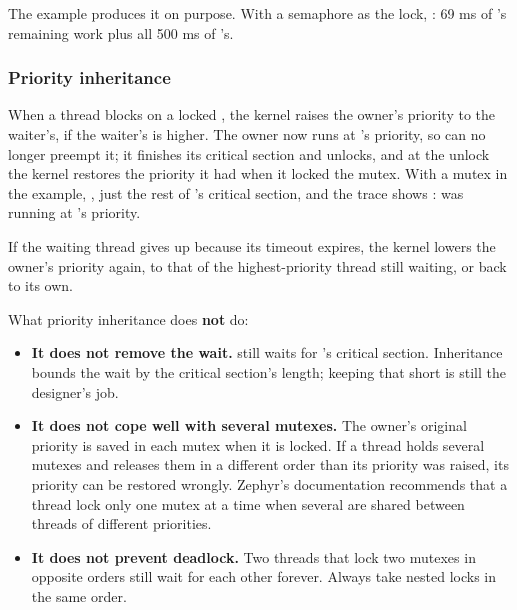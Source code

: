 The  example produces it on purpose. With a semaphore
as the lock, : 69 ms of ’s remaining work plus all 500 ms of
’s.

\subsubsection{Priority inheritance}
When a thread blocks on a locked , the kernel raises the owner’s priority to the
waiter’s, if the waiter’s is higher. The owner now runs at ’s priority, so 
can no longer preempt it; it finishes its critical section and unlocks, and at the unlock the kernel
restores the priority it had when it locked the mutex. With a mutex in the example, , just the rest of ’s critical section, and the trace shows :  was running at ’s priority.


If the waiting thread gives up because its timeout expires, the kernel lowers the owner’s priority
again, to that of the highest-priority thread still waiting, or back to its own.

What priority inheritance does \textbf{not} do:

\begin{itemize}
  \item \textbf{It does not remove the wait.}  still waits for ’s critical section.
    Inheritance bounds the wait by the critical section’s length; keeping that short is still the
    designer’s job.
  \item \textbf{It does not cope well with several mutexes.} The owner’s original priority is saved in each
    mutex when it is locked. If a thread holds several mutexes and releases them in a different order
    than its priority was raised, its priority can be restored wrongly. Zephyr’s documentation
    recommends that a thread lock only one mutex at a time when several are shared between threads of
    different priorities.
  \item \textbf{It does not prevent deadlock.} Two threads that lock two mutexes in opposite orders still
    wait for each other forever. Always take nested locks in the same order.
\end{itemize}

